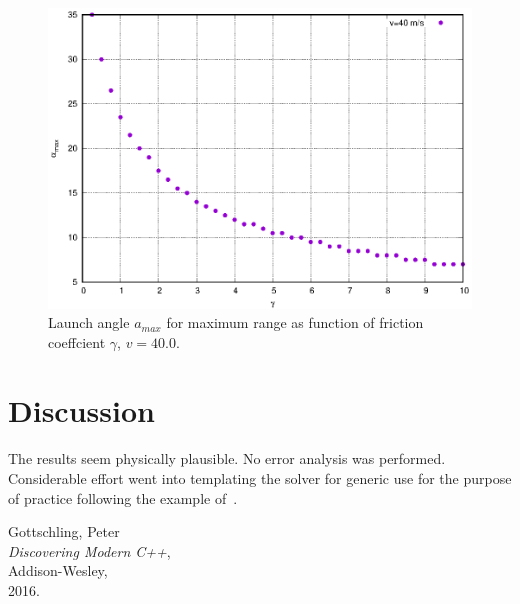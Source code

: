 \documentclass[11pt,a4paper]{article}
\begin{document}
\begin{figure}[ht]
    \begin{center}
    \includegraphics[scale=1.2]{figure2.eps} 
    \end{center}
    \caption{Launch angle $a_{max}$ for maximum range as function of friction coeffcient $\gamma$, $v= 40.0$.}
    \label{fig:2}
\end{figure}
    
\section{Discussion}
The results seem physically plausible. No error analysis was performed.\\
Considerable effort went into templating the solver for generic use for the 
purpose of practice following the example of~\cite{Gottschling}.

\begin{thebibliography}{99}





Gottschling, Peter\\
\emph{Discovering Modern C++},\\
Addison-Wesley,\\
2016.




\end{thebibliography}
\end{document}
